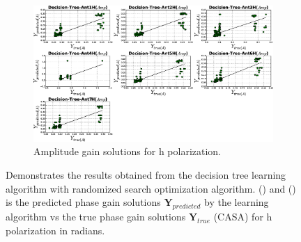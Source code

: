 \begin{figure}[H]
\begin{subfigure}[t]{0.52\textheight}
        \includegraphics[width=\textwidth]{images/Decision-TreeHamp.eps} 
        \caption{Amplitude gain solutions for h polarization.}
         \label{B}
    \end{subfigure}
    \caption{Demonstrates the results obtained from the decision tree learning algorithm with randomized search optimization algorithm. () and () is the predicted phase gain solutions $\textbf{Y}_{predicted}$ by the learning algorithm vs the true phase gain solutions $\textbf{Y}_{true}$ (CASA) for h polarization in radians. }
    \end{figure}
  
